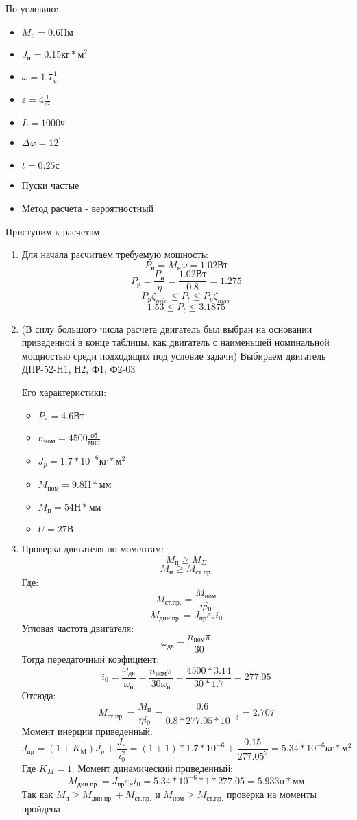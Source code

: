 \documentclass{article}
\begin{document}
\begin{enumerate}
	По условию:
	\begin{itemize}
		\item $M_{н} = 0.6 Нм$
		\item $J_н = 0.15 кг * м^2$
		\item $ \omega = 1.7 \frac{1}{с}$
		\item $ \varepsilon = 4 \frac{1}{c^2} $
		\item $L = 1000 ч$
		\item $ \Delta \varphi = 12^{'}$
		\item $t = 0.25 с$
		\item Пуски частые
		\item Метод расчета - вероятностный
	\end{itemize}
	Приступим к расчетам
	\begin{enumerate}
		\item Для начала расчитаем требуемую мощность:
		$$
		P_н = M_н \omega = 1.02 Вт
		$$
		$$
		P_р = \frac{P_н}{ \eta} = \frac{1.02 Вт}{0.8} = 1.275
		$$
		$$
		P_p \zeta_{min} \le P_t \le P_p \zeta_{max}
		$$	
		$$
		1.53 \le P_t \le 3.1875
		$$
		\item (В силу большого числа расчета двигатель был выбран на основании приведенной в конце таблицы, как двигатель с наименьшей номинальной мощностью среди подходящих под условие задачи) Выбираем двигатель ДПР-52-Н1, Н2, Ф1, Ф2-03

		Его характеристики:
		\begin{itemize}
			\item $P_н = 4.6 Вт$
			\item $n_{ном} = 4500 \frac{об}{мин} $
			\item $J_p = 1.7 * 10^{-6} кг * м^2$
			\item $M_{ном} = 9.8 Н * мм$
			\item $M_п = 54 Н * мм$
			\item $U = 27 В$
		\end{itemize}
		\item Проверка двигателя по моментам:
		$$
		M_п \ge M_{ \Sigma}
		$$
		$$
		M_н \ge M_{ст. пр.}
		$$
		Где:
		$$
		M_{ст. пр.} = \frac{M_{ном}}{ \eta i_0} 
		$$
		$$
		M_{дин. пр.} = J_{пр} \varepsilon_н i_0
		$$
		Угловая частота двигателя:
		$$
		\omega_{дв} = \frac{n_{ном} \pi}{30} 
		$$
		Тогда передаточный коэфициент:
		$$
		i_0 = \frac{ \omega_{дв}}{ \omega_{н}} = \frac{n_{ном} \pi}{30 \omega_{н}} = \frac{4500 * 3.14}{30 * 1.7} = 277.05
		$$
		Отсюда:
		$$
		M_{ст. пр.} = \frac{M_н}{ \eta i_0} = \frac{0.6}{0.8 * 277.05 * 10^{-3}} = 2.707
		$$
		Момент инерции приведенный:
		$$
		J_{пр} = \left(1 + K_М\right) J_p + \frac{J_н}{i_0^2} = \left(1 + 1\right) * 1.7 * 10^{-6} + \frac{0.15}{277.05^2} = 5.34 * 10^{-6} кг * м^2
		$$
		Где $K_M = 1$. Момент динамический приведенный:
		$$
		M_{дин. пр.} = J_{пр} \varepsilon_н i_0 = 5.34 * 10^{-6} * 1 * 277.05 = 5.933 н * мм
		$$
		Так как $M_п \ge M_{дин. пр.} + M_{ст. пр.}$ и $M_{ном} \ge M_{ст. пр.}$ проверка на моменты пройдена
		

\end{enumerate}
\end{enumerate}
\end{document}
